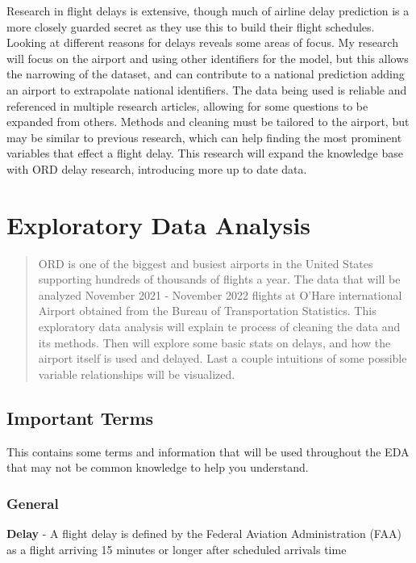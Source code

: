 \documentclass[a4paper,12pt]{article}
\begin{document}
Research in flight delays is extensive, though much of airline delay prediction is a more closely guarded secret as they use this to build their flight schedules. Looking at different reasons for delays reveals some areas of focus.
 My research will focus on the airport and using other identifiers for the model, but this allows the narrowing of the dataset, and can contribute to a national prediction adding an airport to extrapolate national identifiers.
  The data being used is reliable and referenced in multiple research articles,
  allowing for some questions to be expanded from others. Methods and cleaning must be tailored to the airport, but may be similar to previous research, which can help finding the most prominent variables that effect a flight delay.
   This research will expand the knowledge base with ORD delay research, introducing more up to date data.


\section{Exploratory Data Analysis}

\begin{abstract}
    ORD is one of the biggest and busiest airports in the United States supporting hundreds of thousands of flights a year.
    The data that will be analyzed November 2021 - November 2022 flights at O'Hare international Airport obtained from the Bureau of Transportation Statistics.   
    This exploratory data analysis will explain te process of cleaning the data and its methods. Then will explore some basic stats on delays, and how the airport itself is used 
    and delayed. Last a couple intuitions of some possible variable relationships will be visualized.
\end{abstract}

\pagebreak

\subsection{Important Terms}
This contains some terms and information that will be used throughout the EDA that may not be common knowledge to help you understand. 

\subsubsection{General}

\textbf{Delay} - A flight delay is defined by the Federal Aviation Administration (FAA) as a flight arriving 15 minutes or longer after scheduled arrivals time
\end{document}
